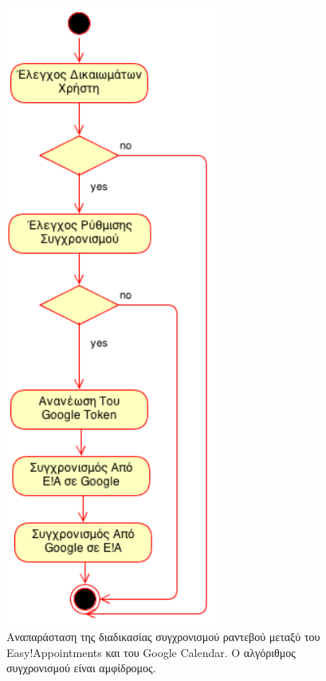 \begin{figure}
\centering
\includegraphics[width=70mm]{images/ad-sync-appointments.png}
\caption{Αναπαράσταση της διαδικασίας συγχρονισμού ραντεβού μεταξύ του Easy!Appointments και του Google Calendar. Ο αλγόριθμος συγχρονισμού είναι αμφίδρομος.}
\label{ad-sync-appointments}
\end{figure}

